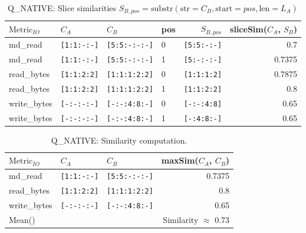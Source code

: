 \documentclass{jhps}
\begin{document}


\begin{table}[t]
\centering
\begin{tabular}{llllrr}
  $\text{Metric}_{IO}$ & $C_A$                 & $C_B$                   & pos & $S_{B,pos}$           & sliceSim($C_A$, $S_B$) \\ 
  \midrule
  md\_read             & \lstinline|[1:1:-:-]| & \lstinline|[5:5:-:-:-]| & 0   & \lstinline|[5:5:-:-]| & 0.7                    \\ 
  md\_read             & \lstinline|[1:1:-:-]| & \lstinline|[5:5:-:-:-]| & 1   & \lstinline|[5:-:-:-]| & 0.7375                 \\ 
  read\_bytes          & \lstinline|[1:1:2:2]| & \lstinline|[1:1:1:2:2]| & 0   & \lstinline|[1:1:1:2]| & 0.7875                 \\ 
  read\_bytes          & \lstinline|[1:1:2:2]| & \lstinline|[1:1:1:2:2]| & 1   & \lstinline|[1:1:2:2]| & 0.8                    \\ 
  write\_bytes         & \lstinline|[-:-:-:-]| & \lstinline|[-:-:4:8:-]| & 0   & \lstinline|[-:-:4:8]| & 0.65                   \\ 
  write\_bytes         & \lstinline|[-:-:-:-]| & \lstinline|[-:-:4:8:-]| & 1   & \lstinline|[-:4:8:-]| & 0.65                   \\ 
\end{tabular}
\caption{Q\_NATIVE: Slice similarities $S_{B,pos} = \text{substr}(\text{str}=C_B, \text{start}=pos, \text{len}=L_A)$}
\label{tab:hex_native:compute_slice_sim}
\end{table}

\begin{table}[t]
\centering
\begin{tabular}{lllr}
  $\text{Metric}_{IO}$ & $C_A$                 & $C_B$                   &  maxSim($C_A$, $C_B$) \\ 
  \midrule
  md\_read             & \lstinline|[1:1:-:-]| & \lstinline|[5:5:-:-:-]| &  0.7375               \\ 
  read\_bytes          & \lstinline|[1:1:2:2]| & \lstinline|[1:1:1:2:2]| &  0.8                  \\ 
  write\_bytes         & \lstinline|[-:-:-:-]| & \lstinline|[-:-:4:8:-]| &  0.65                 \\ 
  \midrule
  Mean()  &                       &                         &  Similarity $\approx$ 0.73        \\ 
\end{tabular}
\caption{Q\_NATIVE: Similarity computation.}
\label{tab:hex_native:compute_sim}
\end{table}
\end{document}
